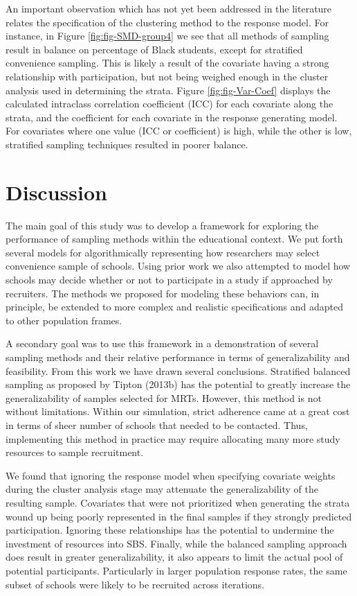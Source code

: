 \documentclass[english,man,floatsintext]{apa6}
\begin{document}
An important observation which has not yet been addressed in the literature relates the specification of the clustering method to the response model. For instance, in Figure \ref{fig:fig-SMD-group4} we see that all methods of sampling result in balance on percentage of Black students, except for stratified convenience sampling. This is likely a result of the covariate having a strong relationship with participation, but not being weighed enough in the cluster analysis used in determining the strata. Figure \ref{fig:fig-Var-Coef} displays the calculated intraclass correlation coefficient (ICC) for each covariate along the strata, and the coefficient for each covariate in the response generating model. For covariates where one value (ICC or coefficient) is high, while the other is low, stratified sampling techniques resulted in poorer balance.

\hypertarget{discussion}{%
\section{Discussion}\label{discussion}}

The main goal of this study was to develop a framework for exploring the performance of sampling methods within the educational context. We put forth several models for algorithmically representing how researchers may select convenience sample of schools. Using prior work we also attempted to model how schools may decide whether or not to participate in a study if approached by recruiters. The methods we proposed for modeling these behaviors can, in principle, be extended to more complex and realistic specifications and adapted to other population frames.

A secondary goal was to use this framework in a demonstration of several sampling methods and their relative performance in terms of generalizability and feasibility. From this work we have drawn several conclusions. Stratified balanced sampling as proposed by Tipton (2013b) has the potential to greatly increase the generalizability of samples selected for MRTs. However, this method is not without limitations. Within our simulation, strict adherence came at a great cost in terms of sheer number of schools that needed to be contacted. Thus, implementing this method in practice may require allocating many more study resources to sample recruitment.

We found that ignoring the response model when specifying covariate weights during the cluster analysis stage may attenuate the generalizability of the resulting sample. Covariates that were not prioritized when generating the strata wound up being poorly represented in the final samples if they strongly predicted participation. Ignoring these relationships has the potential to undermine the investment of resources into SBS. Finally, while the balanced sampling approach does result in greater generalizability, it also appears to limit the actual pool of potential participants. Particularly in larger population response rates, the same subset of schools were likely to be recruited across iterations.
\end{document}

